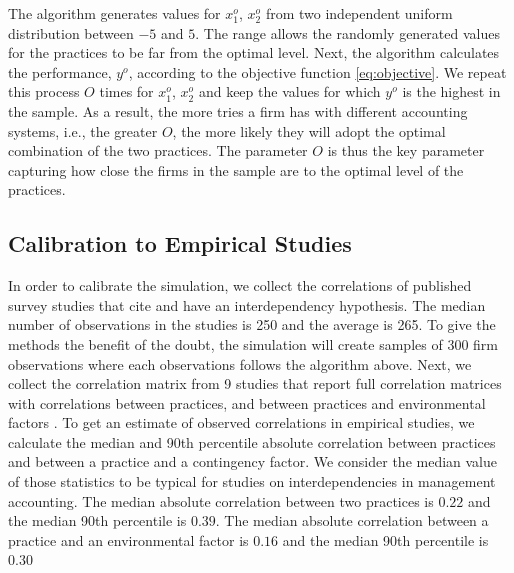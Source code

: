 \documentclass[12pt]{article}
\begin{document}
The algorithm generates values for $x^o_{1}$, $x^o_{2}$ from two independent uniform distribution between $-5$ and $5$. The range allows the randomly generated values for the practices to be far from the optimal level. Next, the algorithm calculates the performance, $y^o$, according to the objective function \eqref{eq:objective}. We repeat this process $O$ times for $x^o_{1}$, $x^o_{2}$ and keep the values for which $y^o$ is the highest in the sample. As a result, the more tries a firm has with different accounting systems, i.e., the greater $O$, the more likely they will adopt the optimal combination of the two practices. The parameter $O$ is thus the key parameter capturing how close the firms in the sample are to the optimal level of the practices. 

\subsection{Calibration to Empirical Studies}\label{calibration-to-empirical-studies}

In order to calibrate the simulation, we collect the correlations of published survey studies that cite \citet{grabner_management_2013} and have an interdependency hypothesis. The median number of observations in the studies is 250 and the average is 265. To give the methods the benefit of the doubt, the simulation will create samples of 300 firm observations where each observations follows the algorithm above. Next, we collect the correlation matrix from 9 studies that report full correlation matrices with correlations between practices, and between practices and environmental factors \citep{dekker_collaborative_2016, grabner_incentive_2014, grabner_cost_2016, bedford_configurations_2015, heinicke_examination_2016, bedford_performance_2019, abernethy_are_2015, sponem_exploring_2016, samagaio_management_2018}. To get an estimate of observed correlations in empirical studies, we calculate the median and 90th percentile absolute correlation between practices and between a practice and a contingency factor. We consider the median value of those statistics to be typical for studies on interdependencies in management accounting. The median absolute correlation between two practices is $0.22$ and the median 90th percentile is $0.39$. The median absolute correlation between a practice and an environmental factor is $0.16$ and the median 90th percentile is $0.30$
\end{document}

